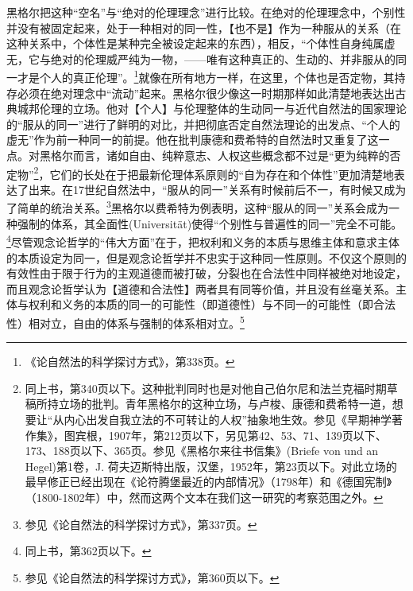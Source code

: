黑格尔把这种“空名”与“绝对的伦理理念”进行比较。在绝对的伦理理念中，个别性并没有被固定起来，处于一种相对的同一性，【也不是】作为一种服从的关系（在这种关系中，个体性是某种完全被设定起来的东西），相反，“个体性自身纯属虚无，它与绝对的伦理威严纯为一物，——唯有这种真正的、生动的、并非服从的同一才是个人的真正伦理”。\footnote{《论自然法的科学探讨方式》，第338页。}就像在所有地方一样，在这里，个体也是否定物，其持存必须在绝对理念中“流动”起来。黑格尔很少像这一时期那样如此清楚地表达出古典城邦伦理的立场。他对【个人】与伦理整体的生动同一与近代自然法的国家理论的“服从的同一”进行了鲜明的对比，并把彻底否定自然法理论的出发点、“个人的虚无”作为前一种同一的前提。他在批判康德和费希特的自然法时又重复了这一点。对黑格尔而言，诸如自由、纯粹意志、人权这些概念都不过是“更为纯粹的否定物”\footnote{同上书，第340页以下。这种批判同时也是对他自己伯尔尼和法兰克福时期草稿所持立场的批判。青年黑格尔的这种立场，与卢梭、康德和费希特一道，想要让“从内心出发自我立法的不可转让的人权”抽象地生效。参见《早期神学著作集》，图宾根，1907年，第212页以下，另见第42、53、71、139页以下、173、188页以下、365页。参见《黑格尔来往书信集》(Briefe von und an Hegel)第1卷，J. 荷夫迈斯特出版，汉堡，1952年，第23页以下。对此立场的最早修正已经出现在《论符腾堡最近的内部情况》（1798年）和《德国宪制》（1800-1802年）中，然而这两个文本在我们这一研究的考察范围之外。}，它们的长处在于把最新伦理体系原则的“自为存在和个体性”更加清楚地表达了出来。在17世纪自然法中，“服从的同一”关系有时候前后不一，有时候又成为了简单的统治关系。\footnote{参见《论自然法的科学探讨方式》，第337页。}黑格尔以费希特为例表明，这种“服从的同一”关系会成为一种强制的体系，其全面性(Universität)使得“个别性与普遍性的同一”完全不可能。\footnote{同上书，第362页以下。}尽管观念论哲学的“伟大方面”在于，把权利和义务的本质与思维主体和意求主体的本质设定为同一，但是观念论哲学并不忠实于这种同一性原则。不仅这个原则的有效性由于限于行为的主观道德而被打破，分裂也在合法性中同样被绝对地设定，而且观念论哲学认为【道德和合法性】两者具有同等价值，并且没有丝毫关系。主体与权利和义务的本质的同一的可能性（即道德性）与不同一的可能性（即合法性）相对立，自由的体系与强制的体系相对立。\footnote{参见《论自然法的科学探讨方式》，第360页以下。}


